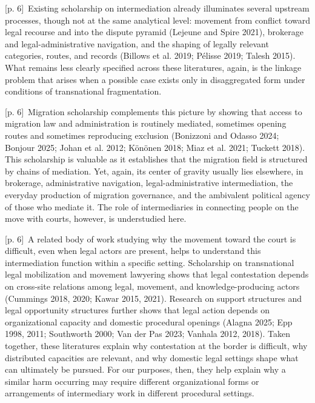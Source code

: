 \documentclass[10pt,a4paper]{article}
\begin{document}
{\scriptsize\color{gray} [p. 6]}\ Existing scholarship on intermediation already illuminates several upstream processes, though not at the same analytical level: movement from conflict toward legal recourse and into the dispute pyramid (Lejeune and Spire 2021), brokerage and legal-administrative navigation, and the shaping of legally relevant categories, routes, and records (Billows et al. 2019; Pélisse 2019; Talesh 2015). What remains less clearly specified across these literatures, again, is the linkage problem that arises when a possible case exists only in disaggregated form under conditions of transnational fragmentation.\par
{\scriptsize\color{gray} [p. 6]}\ Migration scholarship complements this picture by showing that access to migration law and administration is routinely mediated, sometimes opening routes and sometimes reproducing exclusion (Bonizzoni and Odasso 2024; Bonjour 2025; Johan et al. 2012; Könönen 2018; Miaz et al. 2021; Tuckett 2018). This scholarship is valuable as it establishes that the migration field is structured by chains of mediation. Yet, again, its center of gravity usually lies elsewhere, in brokerage, administrative navigation, legal-administrative intermediation, the everyday production of migration governance, and the ambivalent political agency of those who mediate it. The role of intermediaries in connecting people on the move with courts, however, is understudied here.\par
{\scriptsize\color{gray} [p. 6]}\ A related body of work studying why the movement toward the court is difficult, even when legal actors are present, helps to understand this intermediation function within a specific setting. Scholarship on transnational legal mobilization and movement lawyering shows that legal contestation depends on cross-site relations among legal, movement, and knowledge-producing actors (Cummings 2018, 2020; Kawar 2015, 2021). Research on support structures and legal opportunity structures further shows that legal action depends on organizational capacity and domestic procedural openings (Alagna 2025; Epp 1998, 2011; Southworth 2000; Van der Pas 2023; Vanhala 2012, 2018). Taken together, these literatures explain why contestation at the border is difficult, why distributed capacities are relevant, and why domestic legal settings shape what can ultimately be pursued. For our purposes, then, they help explain why a similar harm occurring may require different organizational forms or arrangements of intermediary work in different procedural settings.\par
\end{document}
